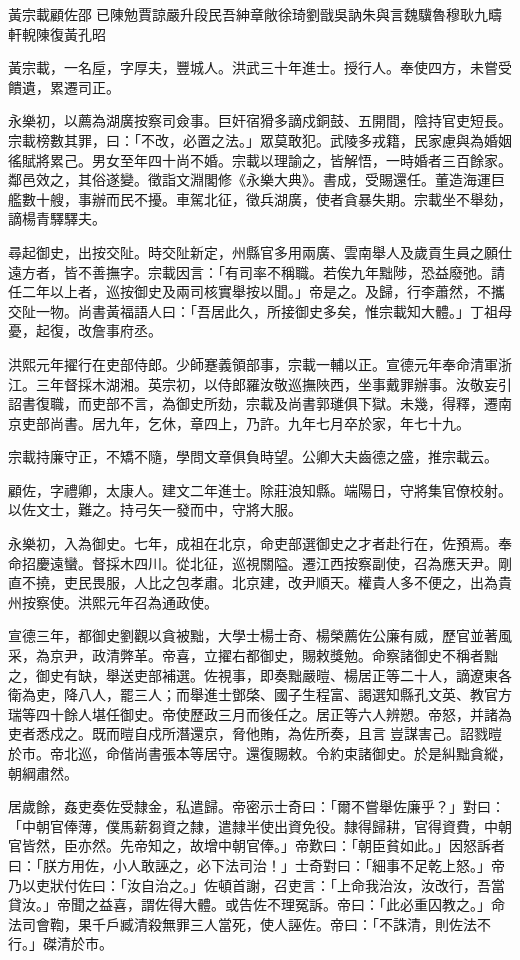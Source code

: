 
\begin{pinyinscope}
黃宗載顧佐邵已陳勉賈諒嚴升段民吾紳章敞徐琦劉戩吳訥朱與言魏驥魯穆耿九疇軒輗陳復黃孔昭

黃宗載，一名垕，字厚夫，豐城人。洪武三十年進士。授行人。奉使四方，未嘗受饋遺，累遷司正。

永樂初，以薦為湖廣按察司僉事。巨奸宿猾多謫戍銅鼓、五開間，陰持官吏短長。宗載榜數其罪，曰：「不改，必置之法。」眾莫敢犯。武陵多戎籍，民家慮與為婚姻徭賦將累己。男女至年四十尚不婚。宗載以理諭之，皆解悟，一時婚者三百餘家。鄰邑效之，其俗遂變。徵詣文淵閣修《永樂大典》。書成，受賜還任。董造海運巨艦數十艘，事辦而民不擾。車駕北征，徵兵湖廣，使者貪暴失期。宗載坐不舉劾，謫楊青驛驛夫。

尋起御史，出按交阯。時交阯新定，州縣官多用兩廣、雲南舉人及歲貢生員之願仕遠方者，皆不善撫字。宗載因言：「有司率不稱職。若俟九年黜陟，恐益廢弛。請任二年以上者，巡按御史及兩司核實舉按以聞。」帝是之。及歸，行李蕭然，不攜交阯一物。尚書黃福語人曰：「吾居此久，所接御史多矣，惟宗載知大體。」丁祖母憂，起復，改詹事府丞。

洪熙元年擢行在吏部侍郎。少師蹇義領部事，宗載一輔以正。宣德元年奉命清軍浙江。三年督採木湖湘。英宗初，以侍郎羅汝敬巡撫陜西，坐事戴罪辦事。汝敬妄引詔書復職，而吏部不言，為御史所劾，宗載及尚書郭璡俱下獄。未幾，得釋，遷南京吏部尚書。居九年，乞休，章四上，乃許。九年七月卒於家，年七十九。

宗載持廉守正，不矯不隨，學問文章俱負時望。公卿大夫齒德之盛，推宗載云。

顧佐，字禮卿，太康人。建文二年進士。除莊浪知縣。端陽日，守將集官僚校射。以佐文士，難之。持弓矢一發而中，守將大服。

永樂初，入為御史。七年，成祖在北京，命吏部選御史之才者赴行在，佐預焉。奉命招慶遠蠻。督採木四川。從北征，巡視關隘。遷江西按察副使，召為應天尹。剛直不撓，吏民畏服，人比之包孝肅。北京建，改尹順天。權貴人多不便之，出為貴州按察使。洪熙元年召為通政使。

宣德三年，都御史劉觀以貪被黜，大學士楊士奇、楊榮薦佐公廉有威，歷官並著風采，為京尹，政清弊革。帝喜，立擢右都御史，賜敕獎勉。命察諸御史不稱者黜之，御史有缺，舉送吏部補選。佐視事，即奏黜嚴暟、楊居正等二十人，謫遼東各衛為吏，降八人，罷三人；而舉進士鄧棨、國子生程富、謁選知縣孔文英、教官方瑞等四十餘人堪任御史。帝使歷政三月而後任之。居正等六人辨愬。帝怒，并諸為吏者悉戍之。既而暟自戍所潛還京，脅他賄，為佐所奏，且言豈謀害己。詔戮暟於市。帝北巡，命偕尚書張本等居守。還復賜敕。令約束諸御史。於是糾黜貪縱，朝綱肅然。

居歲餘，姦吏奏佐受隸金，私遣歸。帝密示士奇曰：「爾不嘗舉佐廉乎？」對曰：「中朝官俸薄，僕馬薪芻資之隸，遣隸半使出資免役。隸得歸耕，官得資費，中朝官皆然，臣亦然。先帝知之，故增中朝官俸。」帝歎曰：「朝臣貧如此。」因怒訴者曰：「朕方用佐，小人敢誣之，必下法司治！」士奇對曰：「細事不足乾上怒。」帝乃以吏狀付佐曰：「汝自治之。」佐頓首謝，召吏言：「上命我治汝，汝改行，吾當貸汝。」帝聞之益喜，謂佐得大體。或告佐不理冤訴。帝曰：「此必重囚教之。」命法司會鞫，果千戶臧清殺無罪三人當死，使人誣佐。帝曰：「不誅清，則佐法不行。」磔清於市。


\end{pinyinscope}
